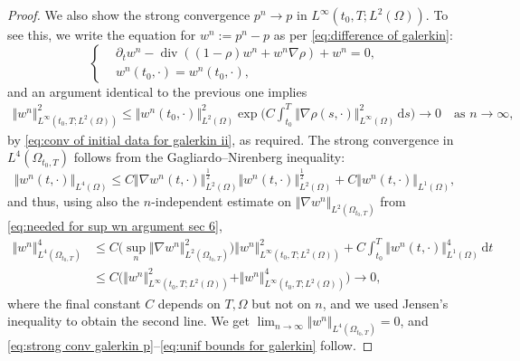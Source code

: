 \documentclass[11pt,a4paper,reqno]{amsart}
\theoremstyle{remark}
\theoremstyle{definition}
\numberwithin{equation}{section}
\DeclareMathOperator{\dv}{div}
\renewcommand{\d}{\, \mathrm{d} }
\begin{document}
\begin{proof}
We also show the strong convergence $p^n \to p$ in $L^\infty(t_0,T;L^2(\Omega))$. To see this, we write the equation for $w^n := p^n - p$ as per \eqref{eq:difference of galerkin}:
\begin{equation*}
        \left\lbrace\begin{aligned}
        & \partial_t w^n - \dv((1-\rho)w^n + w^n \nabla \rho) + w^n = 0, \\ 
        & w^n(t_0,\cdot) = w^n(t_0,\cdot), 
    \end{aligned}\right.
\end{equation*}
and an argument identical to the previous one implies 
\begin{equation*}
    \begin{aligned}
        \Vert w^n \Vert^2_{L^\infty(t_0,T;L^2(\Omega))} \leq \Vert w^n(t_0,\cdot)\Vert^2_{L^2(\Omega)}\exp\bigg( C \int_{t_0}^T \Vert \nabla \rho(s,\cdot) \Vert^2_{L^\infty(\Omega)} \d s \bigg) \to 0 \quad \text{as } n \to \infty, 
    \end{aligned}
\end{equation*}
by \eqref{eq:conv of initial data for galerkin ii}, as required. The strong convergence in $L^4(\Omega_{t_0,T})$ follows from the Gagliardo--Nirenberg inequality: 
\begin{equation*}
    \Vert w^n(t,\cdot) \Vert_{L^4(\Omega)} \leq C \Vert \nabla w^n(t,\cdot) \Vert_{L^2(\Omega)}^{\frac{1}{2}} \Vert w^n(t,\cdot) \Vert^{\frac{1}{2}}_{L^2(\Omega)} + C \Vert w^n(t,\cdot) \Vert_{L^1(\Omega)}, 
\end{equation*}
and thus, using also the $n$-independent estimate on $\Vert \nabla w^n \Vert_{L^2(\Omega_{t_0,T})}$ from \eqref{eq:needed for sup wn argument sec 6}, 
\begin{equation*}
    \begin{aligned}
        \Vert w^n \Vert_{L^4(\Omega_{t_0,T})}^4 &\leq C \big(\sup_n \Vert \nabla w^n \Vert_{L^2(\Omega_{t_0,T})}^{2}\big) \Vert w^n \Vert^{2}_{L^\infty(t_0,T;L^2(\Omega))} + C \int_{t_0}^T \Vert w^n(t,\cdot) \Vert_{L^1(\Omega)}^4 \d t \\ 
        &\leq C\Big(\Vert w^n \Vert^{2}_{L^\infty(t_0,T;L^2(\Omega))} + \Vert w^n \Vert^{4}_{L^\infty(t_0,T;L^2(\Omega))}\Big) \to 0, 
    \end{aligned}
\end{equation*}
where the final constant $C$ depends on $T,\Omega$ but not on $n$, and we used Jensen's inequality to obtain the second line. We get $\lim_{n\to\infty} \Vert w^n \Vert_{L^4(\Omega_{t_0,T})}=0$, and \eqref{eq:strong conv galerkin p}--\eqref{eq:unif bounds for galerkin} follow. 
\end{proof}
\end{document}
